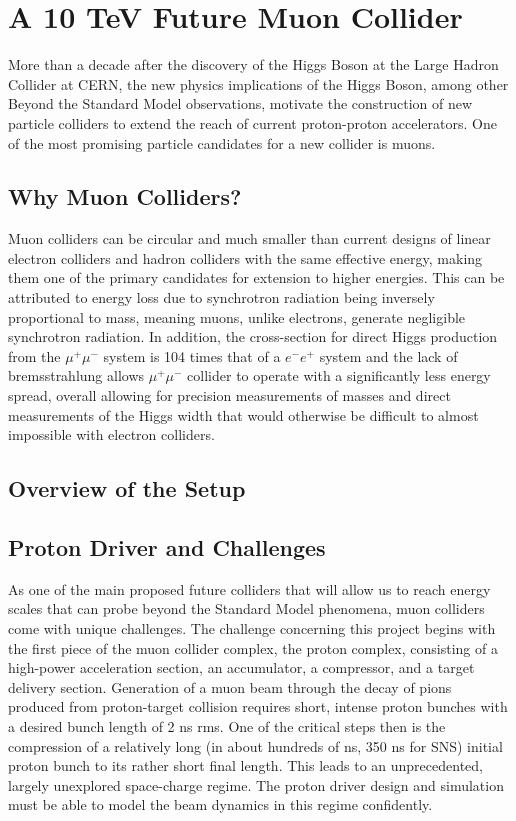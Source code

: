 \documentclass[12pt]{article}
\begin{document}
\newpage
{}

\tableofcontents

\newpage
{}
\section{A 10 TeV Future Muon Collider}
\par\noindent More than a decade after the discovery of the Higgs Boson at the Large Hadron Collider at CERN, the new physics implications of the Higgs Boson, among other Beyond the Standard Model observations, motivate the construction of new particle colliders to extend the reach of current proton-proton accelerators. One of the most promising particle candidates for a new collider is muons.
\subsection{Why Muon Colliders?}
\par\noindent Muon colliders can be circular and much smaller than current designs of linear electron colliders and hadron colliders with the same effective energy, making them one of the primary candidates for extension to higher energies. This can be attributed to energy loss due to synchrotron radiation being inversely proportional to mass, meaning muons, unlike electrons, generate negligible synchrotron radiation. In addition, the cross-section for direct Higgs production from the $\mu^+\mu^-$ system is 104 times that of a $e^-e^+$ system and the lack of bremsstrahlung allows $\mu^+\mu^-$ collider to operate with a significantly less energy spread, overall allowing for precision measurements of masses and direct measurements of the Higgs width that would otherwise be difficult to almost impossible with electron colliders.
\subsection{Overview of the Setup}
\subsection{Proton Driver and Challenges}
\par\noindent As one of the main proposed future colliders that will allow us to reach energy scales that can probe beyond the Standard Model phenomena, muon colliders come with unique challenges. The challenge concerning this project begins with the first piece of the muon collider complex, the proton complex, consisting of a high-power acceleration section, an accumulator, a compressor, and a target delivery section. Generation of a muon beam through the decay of pions produced from proton-target collision requires short, intense proton bunches with a desired bunch length of 2 ns rms. One of the critical steps then is the compression of a relatively long (in about hundreds of ns, 350 ns for SNS) initial proton bunch to its rather short final length. This leads to an unprecedented, largely unexplored space-charge regime. The proton driver design and simulation must be able to model the beam dynamics in this regime confidently.
\end{document}
